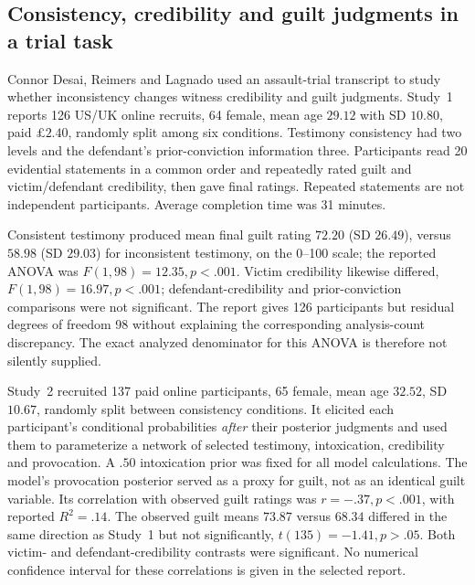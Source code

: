 \subsection{Consistency, credibility and guilt judgments in a trial task}
\label{sec:p16-rat42-legal-study}

Connor Desai, Reimers and Lagnado used an assault-trial transcript to
study whether inconsistency changes witness credibility and guilt judgments.
Study~1 reports 126 US/UK online recruits, 64 female, mean age
\(29.12\) with SD \(10.80\), paid \(\pounds2.40\), randomly split
among six conditions. Testimony consistency had two levels and the
defendant's prior-conviction information three. Participants read 20
evidential statements in a common order and repeatedly rated guilt and
victim/defendant credibility, then gave final ratings. Repeated statements
are not independent participants. Average completion time was 31 minutes.
\cite[pp.~626--628]{ConnorDesaiReimersLagnado2016Credibility}

Consistent testimony produced mean final guilt rating \(72.20\)
(SD \(26.49\)), versus \(58.98\) (SD \(29.03\)) for inconsistent
testimony, on the 0--100 scale; the reported ANOVA was
\(F(1,98)=12.35,p<.001\). Victim credibility likewise differed,
\(F(1,98)=16.97,p<.001\); defendant-credibility and prior-conviction
comparisons were not significant. The report gives 126 participants
but residual degrees of freedom 98 without explaining the corresponding
analysis-count discrepancy. The exact analyzed denominator for this
ANOVA is therefore not silently supplied.

Study~2 recruited 137 paid online participants, 65 female, mean age
\(32.52\), SD \(10.67\), randomly split between consistency conditions.
It elicited each participant's conditional probabilities \emph{after}
their posterior judgments and used them to parameterize a network of
selected testimony, intoxication, credibility and provocation. A
\(.50\) intoxication prior was fixed for all model calculations.
The model's provocation posterior served as a proxy for guilt, not as
an identical guilt variable. Its correlation with observed guilt ratings
was \(r=-.37,p<.001\), with reported \(R^2=.14\).
The observed guilt means \(73.87\) versus \(68.34\) differed in the
same direction as Study~1 but not significantly,
\(t(135)=-1.41,p>.05\). Both victim- and defendant-credibility
contrasts were significant. No numerical confidence interval for these
correlations is given in the selected report.
\cite[pp.~629--631]{ConnorDesaiReimersLagnado2016Credibility}

